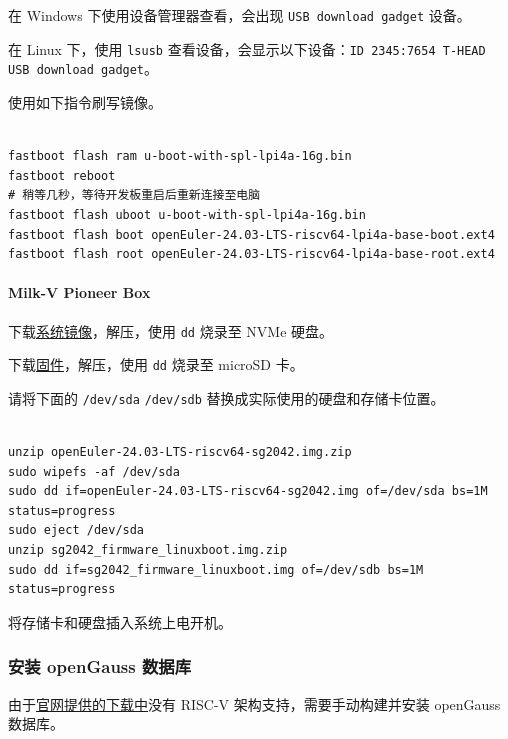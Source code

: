 \documentclass{article}
\begin{document}
在 Windows 下使用设备管理器查看，会出现 \verb|USB download gadget| 设备。

在 Linux 下，使用 \verb|lsusb| 查看设备，会显示以下设备：\verb|ID 2345:7654 T-HEAD USB download gadget|。

使用如下指令刷写镜像。

\begin{verbatim}
  
fastboot flash ram u-boot-with-spl-lpi4a-16g.bin
fastboot reboot
# 稍等几秒，等待开发板重启后重新连接至电脑
fastboot flash uboot u-boot-with-spl-lpi4a-16g.bin
fastboot flash boot openEuler-24.03-LTS-riscv64-lpi4a-base-boot.ext4
fastboot flash root openEuler-24.03-LTS-riscv64-lpi4a-base-root.ext4

\end{verbatim}

\paragraph{Milk-V Pioneer Box}
下载\href{https://mirrors.hust.edu.cn/openeuler/openEuler-24.03-LTS/embedded_img/riscv64/SG2042/openEuler-24.03-LTS-riscv64-sg2042.img.zip}{系统镜像}，解压，使用 \verb|dd| 烧录至 NVMe 硬盘。

下载\href{https://mirrors.hust.edu.cn/openeuler/openEuler-24.03-LTS/embedded_img/riscv64/SG2042/sg2042_firmware_linuxboot.img.zip}{固件}，解压，使用 \verb|dd| 烧录至 microSD 卡。

请将下面的 \verb|/dev/sda| \verb|/dev/sdb| 替换成实际使用的硬盘和存储卡位置。

\begin{verbatim}
  
unzip openEuler-24.03-LTS-riscv64-sg2042.img.zip
sudo wipefs -af /dev/sda
sudo dd if=openEuler-24.03-LTS-riscv64-sg2042.img of=/dev/sda bs=1M status=progress
sudo eject /dev/sda
unzip sg2042_firmware_linuxboot.img.zip
sudo dd if=sg2042_firmware_linuxboot.img of=/dev/sdb bs=1M status=progress

\end{verbatim}

将存储卡和硬盘插入系统上电开机。

\subsubsection{安装 openGauss 数据库}

由于\href{https://opengauss.org/zh/download/}{官网提供的下载中}没有 RISC-V 架构支持，需要手动构建并安装 openGauss 数据库。
\end{document}
